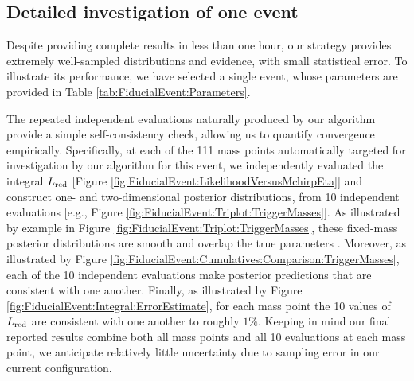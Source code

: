 \subsection{Detailed investigation of one event}
%    

Despite providing complete results in less than one hour, our strategy provides extremely well-sampled distributions and
evidence, with small statistical error.   To illustrate its performance, we have selected a single event, whose
parameters are provided in Table \ref{tab:FiducialEvent:Parameters}.   
%



The repeated independent evaluations naturally produced by our algorithm provide a simple self-consistency check,
allowing us to quantify convergence empirically.  
Specifically, at each of the 111 mass points automatically targeted for investigation by our algorithm for this event, we
independently evaluated the integral $L_{\rm red}$ [Figure \ref{fig:FiducialEvent:LikelihoodVersusMchirpEta}] and construct one- and two-dimensional posterior distributions, from
10 independent evaluations [e.g., Figure \ref{fig:FiducialEvent:Triplot:TriggerMasses}].    
%
As illustrated by example in Figure \ref{fig:FiducialEvent:Triplot:TriggerMasses}, these fixed-mass posterior
distributions are smooth and overlap the true parameters .  
%
Moreover, as illustrated by Figure \ref{fig:FiducialEvent:Cumulatives:Comparison:TriggerMasses}, each of the 10
independent evaluations make posterior predictions that are consistent with one another.   
%
Finally, as illustrated by Figure \ref{fig:FiducialEvent:Integral:ErrorEstimate}, for each mass point the 10 values of $L_{\rm red}$
are consistent with one another to roughly $1\%$.  
%
Keeping in mind our final reported results combine both all mass points and all 10 evaluations at each mass point, we
anticipate relatively little uncertainty due to sampling error in our current configuration.  


